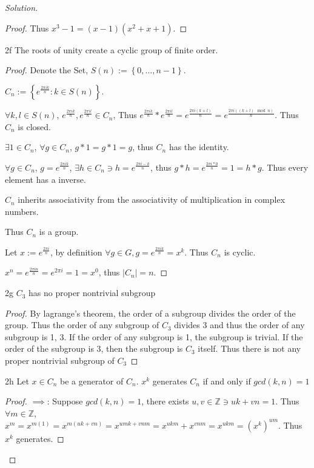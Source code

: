 \documentclass{article}
\newcommand{\Z}{\mathbb{Z}}
\newenvironment{solution}
{\renewcommand\qedsymbol{$\blacksquare$}\begin{proof}[Solution]}
{\end{proof}}
\begin{document}
\begin{solution}
\begin{proof}
        Thus $x^3 - 1 = (x-1)(x^2 + x + 1)$. 
    \end{proof}


    \begin{claim}{2f}\label{Claim 2f.}
        The roots of unity create a cyclic group of finite order.
    \end{claim}
    \begin{proof} 

        Denote the Set, $S(n) := \left\{ 0, \dots, n-1 \right\}$.

        $C_n := \left\{ e^{\frac{2 \pi i k}{n}} : k \in S(n) \right\}$.
        
        $\forall k, l \in S(n)$, $e^{\frac{2 \pi i k}{n}}, e^{\frac{2 \pi i l}{n}} \in C_n$, Thus $e^{\frac{2 \pi i k}{n}} * e^{\frac{2 \pi i l}{n}} = e^{\frac{2 \pi i (k + l)}{n}} = e^{\frac{2 \pi i ((k + l) \mod n)}{n}}$. Thus $C_n$ is closed. 
        
        $\exists 1 \in C_n$, $\forall g \in C_n$, $g * 1 = g * 1 = g$, thus $C_n$ has the identity.
        
        $\forall g \in C_n$, $g = e^{\frac{2 \pi i k}{n}}$, $\exists h \in C_n \ni h = e^{\frac{2 \pi i -k}{n}}$, thus $g * h = e^{\frac{2 \pi i * 0}{n}} = 1 = h *g$. Thus every element has a inverse. 
        
        $C_n$ inherits associativity from the associativity of multiplication in complex numbers. 
        
        Thus $C_n$ is a group.
        
        Let $x := e^{\frac{2 \pi i}{n}}$, by definition $\forall g \in G, g = e^{\frac{2 \pi i k}{n}} = x^k$. Thus $C_n$ is cyclic. 
        
        
        $x^n = e^{\frac{2 \pi i n}{n}} =e^{2 \pi i} = 1 = x^0$, thus $|C_n| = n$.  
    \end{proof}
    \begin{claim}{2g}\label{Claim 2g.}
        $C_3$ has no proper nontrivial subgroup 
    \end{claim}
    \begin{proof}
        By lagrange's theorem, the order of a subgroup divides the order of the group. Thus the order of any subgroup of $C_3$ divides 3 and thus the order of any subgroup is 1, 3. If the order of any subgroup is 1, the subgroup is trivial. If the order of the subgroup is 3, then the subgroup is $C_3$ itself. Thus there is not any proper nontrivial subgroup of $C_3$  
    \end{proof}
    \begin{claim}{2h}\label{Claim 2h.}
        Let $x \in C_n$ be a generator of $C_n$. $x^k$ generates $C_n$ if and only if $gcd(k, n) = 1$   
    \end{claim}
    \begin{proof}
        $\implies$: Suppose $gcd(k , n)= 1$, there exists $u, v \in \Z \ni uk + vn = 1$. Thus $\forall m \in \Z$, $x^m = x^{m(1)} = x^{m(uk + vn)} = x^{umk + vnm} = x^{ukm} + x^{vnm} = x^{ukm} = (x^k)^{um}$. Thus $x^k$ generates.
        

\end{proof}
\end{solution}
\end{document}
